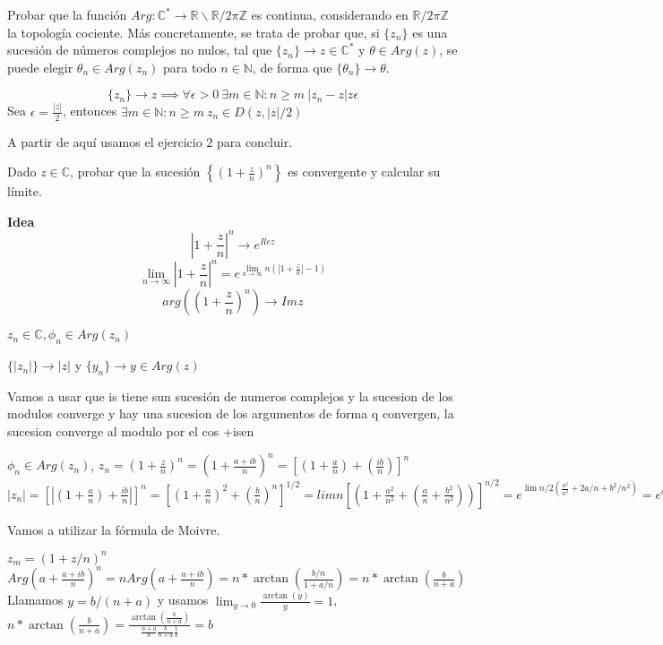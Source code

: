 \begin{ejer}
	Probar que la función $Arg : \mathbb{C}^{\ast} \rightarrow \mathbb{R}\backslash \mathbb{R}/2\pi\mathbb{Z}$ es continua, considerando en $\mathbb{R}/2\pi\mathbb{Z}$ la topología cociente. Más concretamente, se trata de probar que, si $\{z_n\}$ es una sucesión de números complejos no nulos, tal que $\{z_n\} \rightarrow z\in\mathbb{C}^{\ast}$ y $\theta\in Arg(z)$, se puede elegir $\theta_n\in Arg(z_n)$ para todo $n\in\mathbb{N}$, de forma que $\{ \theta_n \} \rightarrow \theta$.
\end{ejer}




\begin{sol}


$$
\{ z_n \} \rightarrow z \implies \forall \epsilon>0\ \exists m\in\mathbb{N} : n\geq m \ |z_n-z|z\epsilon
$$
Sea $\epsilon = \frac{|z|}{2}$, entonces 
$\exists m\in\mathbb{N} :  n\geq m\ z_n\in D(z, |z|/2)$

A partir de aquí usamos el ejercicio $2$ para concluir.
\end{sol}



\begin{ejer}
	Dado $z\in\mathbb{C}$, probar que la sucesión $\left\{ \left( 1+\frac{z}{n} \right)^n \right\}$ es convergente y calcular su límite.
\end{ejer}


\textbf{Idea}
$$
|1+\frac{z}{n}|^n \rightarrow e^{Re z}
$$
$$
\lim_{n\rightarrow\infty} |1+\frac{z}{n}|^n 
= e^{ \lim_{n\rightarrow\infty} n(|1+\frac{z}{n}|-1) }
$$
$$
arg((1+\frac{z}{n})^n) \rightarrow Im z
$$

\begin{sol}



$z_n\in\mathbb{C}, \phi_n\in Arg(z_n)$

$\{ |z_n| \} \rightarrow |z|$ y $\{y_n\} \rightarrow y\in Arg(z)$

Vamos a usar que is tiene sun sucesión de numeros complejos y la sucesion de los modulos converge y hay una sucesion de los argumentos de forma q convergen, la sucesion converge al modulo por el cos +isen

$\phi_n \in Arg(z_n)$, $z_n = (1+\frac{z}{n})^n = (1+\frac{a+ib}{n})^n
= [(1+\frac{a}{n}) + (\frac{ib}{n})] ^n$
$|z_n| = [| (1+\frac{a}{n}) + \frac{ib}{n} |] ^n
= [ (1+\frac{a}{n})^2 + (\frac{b}{n})^n ]^{1/2}
= lim n [ (1+\frac{a^2}{n^2} + (\frac{a}{n}+\frac{b^2}{n^2}) )]^{n/2}
= e^{  \lim n/2 (\frac{a^2}{n^2} + 2a/n + b^2/n^2 )  } = e^a = e^{Re z}$ 

Vamos a utilizar la fórmula de Moivre.

$ z_m = (1+z/n)^n$
$Arg(a+ \frac{a+ib}{n})^n = n Arg(a+\frac{a+ib}{n}) = n*\arctan (\frac{b/n}{1+a/n}) = n*\arctan(\frac{b}{n+a})$
Llamamos $y=b/(n+a)$ y usamos $\lim_{y\rightarrow0} \frac{\arctan(y)}{y} = 1$,
$n*\arctan(\frac{b}{n+a}) = \frac{\arctan(\frac{b}{n+a})}{ \frac{n+a}{n}\frac{b}{n+a}\frac{1}{b} } = b$
\end{sol}